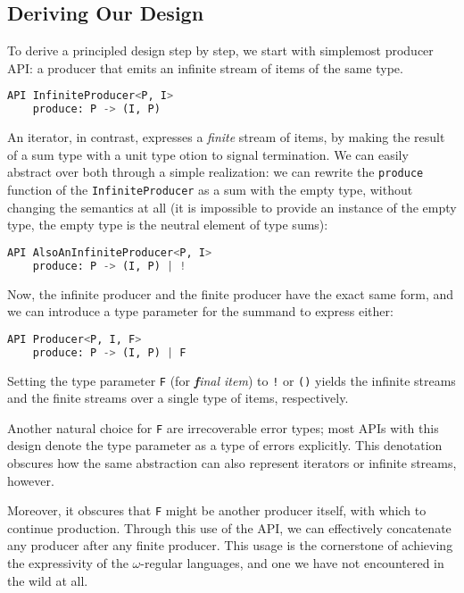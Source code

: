 \documentclass[sigplan,screen,10pt,anonymous,review]{acmart}
\begin{document}
\subsection{Deriving Our Design}\label{derive}

To derive a principled design step by step, we start with simplemost producer API: a producer that emits an infinite stream of items of the same type.

\begin{lstlisting}[language=Python]
API InfiniteProducer<P, I>
    produce: P -> (I, P)
\end{lstlisting}

An iterator, in contrast, expresses a \textit{finite} stream of items, by making the result of a sum type with a unit type otion to signal termination. We can easily abstract over both through a simple realization: we can rewrite the \texttt{produce} function of the \texttt{InfiniteProducer} as a sum with the empty type, without changing the semantics at all (it is impossible to provide an instance of the empty type, the empty type is the neutral element of type sums):

\begin{lstlisting}[language=Python]
API AlsoAnInfiniteProducer<P, I>
    produce: P -> (I, P) | !
\end{lstlisting}

Now, the infinite producer and the finite producer have the exact same form, and we can introduce a type parameter for the summand to express either:

\begin{lstlisting}[language=Python]
API Producer<P, I, F>
    produce: P -> (I, P) | F
\end{lstlisting}

Setting the type parameter \texttt{F} (for \textit{\textbf{f}inal item}) to \texttt{!} or \texttt{()} yields the infinite streams and the finite streams over a single type of items, respectively.

Another natural choice for \texttt{F} are irrecoverable error types; most APIs with this design denote the type parameter as a type of errors explicitly. This denotation obscures how the same abstraction can also represent iterators or infinite streams, however.

Moreover, it obscures that \texttt{F} might be another producer itself, with which to continue production. Through this use of the API, we can effectively concatenate any producer after any finite producer. This usage is the cornerstone of achieving the expressivity of the $\omega$-regular languages, and one we have not encountered in the wild at all.
\end{document}
